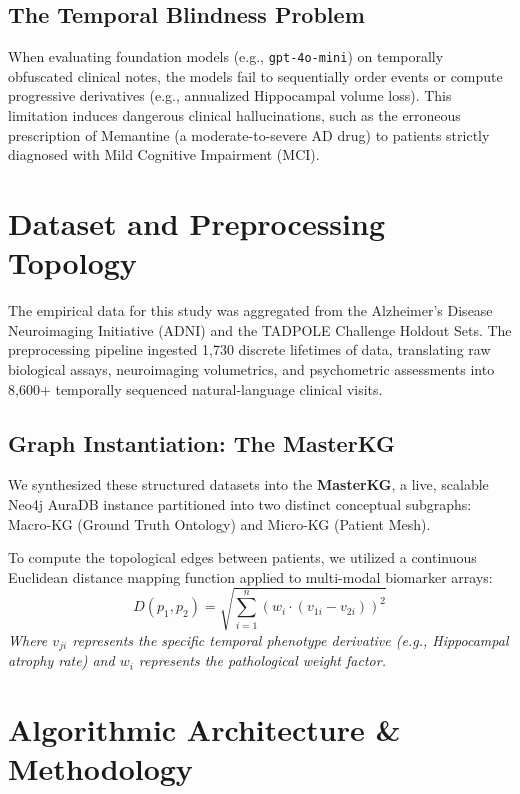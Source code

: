 \documentclass[11pt,a4paper]{article}
\begin{document}
\subsection{The Temporal Blindness Problem}
When evaluating foundation models (e.g., \texttt{gpt-4o-mini}) on temporally obfuscated clinical notes, the models fail to sequentially order events or compute progressive derivatives (e.g., annualized Hippocampal volume loss). This limitation induces dangerous clinical hallucinations, such as the erroneous prescription of Memantine (a moderate-to-severe AD drug) to patients strictly diagnosed with Mild Cognitive Impairment (MCI).

\section{Dataset and Preprocessing Topology}

The empirical data for this study was aggregated from the Alzheimer's Disease Neuroimaging Initiative (ADNI) and the TADPOLE Challenge Holdout Sets. The preprocessing pipeline ingested 1,730 discrete lifetimes of data, translating raw biological assays, neuroimaging volumetrics, and psychometric assessments into 8,600+ temporally sequenced natural-language clinical visits.

\subsection{Graph Instantiation: The MasterKG}
We synthesized these structured datasets into the \textbf{MasterKG}, a live, scalable Neo4j AuraDB instance partitioned into two distinct conceptual subgraphs: Macro-KG (Ground Truth Ontology) and Micro-KG (Patient Mesh).

To compute the topological edges between patients, we utilized a continuous Euclidean distance mapping function applied to multi-modal biomarker arrays:
\begin{equation}
D(p_1, p_2) = \sqrt{\sum_{i=1}^{n} \left(w_i \cdot (v_{1i} - v_{2i})\right)^2}
\end{equation}
\textit{Where $v_{ji}$ represents the specific temporal phenotype derivative (e.g., Hippocampal atrophy rate) and $w_i$ represents the pathological weight factor.}

\section{Algorithmic Architecture \& Methodology}
\end{document}
